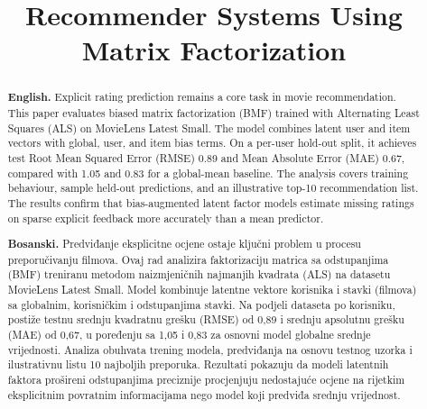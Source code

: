\documentclass[conference]{IEEEtran}
\begin{document}
\title{Recommender Systems Using Matrix Factorization}

\author{
\and
{}
}

\maketitle

\begin{abstract}
\textbf{English.} Explicit rating prediction remains a core task in movie recommendation. This paper evaluates biased matrix factorization (BMF) trained with Alternating Least Squares (ALS) on MovieLens Latest Small. The model combines latent user and item vectors with global, user, and item bias terms. On a per-user hold-out split, it achieves test Root Mean Squared Error (RMSE) 0.89 and Mean Absolute Error (MAE) 0.67, compared with 1.05 and 0.83 for a global-mean baseline. The analysis covers training behaviour, sample held-out predictions, and an illustrative top-10 recommendation list. The results confirm that bias-augmented latent factor models estimate missing ratings on sparse explicit feedback more accurately than a mean predictor.

\textbf{Bosanski.} Predviđanje eksplicitne ocjene ostaje ključni problem u procesu preporučivanju filmova. Ovaj rad analizira faktorizaciju matrica sa odstupanjima (BMF) treniranu metodom naizmjeničnih najmanjih kvadrata (ALS) na datasetu MovieLens Latest Small.  Model kombinuje latentne vektore korisnika i stavki (filmova) sa globalnim, korisničkim i odstupanjima stavki. Na podjeli dataseta po korisniku, postiže testnu srednju kvadratnu grešku (RMSE) od 0,89 i srednju apsolutnu grešku (MAE) od 0,67, u poređenju sa 1,05 i 0,83 za osnovni model globalne srednje vrijednosti. Analiza obuhvata trening modela, predviđanja na osnovu testnog uzorka i ilustrativnu listu 10 najboljih preporuka. Rezultati pokazuju da modeli latentnih faktora prošireni odstupanjima preciznije procjenjuju nedostajuće ocjene na rijetkim eksplicitnim povratnim informacijama nego model koji predviđa srednju vrijednost.
\end{abstract}
\end{document}
